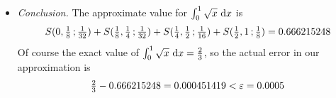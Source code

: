 {\begin{itemize}
\item\emph{Conclusion.} The approximate value for $\int_0^1\sqrt{x}\ \mathrm{d}x$
is
\begin{equation*}
S(0,\tfrac{1}{8}\,;\tfrac{1}{32})
+S(\tfrac{1}{8},\tfrac{1}{4}\,;\tfrac{1}{32})
+S(\tfrac{1}{4},\tfrac{1}{2}\,;\tfrac{1}{16})
+S(\tfrac{1}{2},1\,;\tfrac{1}{8})
=0.666215248
\end{equation*}
Of course the exact value of $\int_0^1\sqrt{x}\ \mathrm{d}x=\tfrac{2}{3}$,
so the actual error in our approximation is
\begin{equation*}
\tfrac{2}{3}-0.666215248 = 0.000451419 <\varepsilon = 0.0005
\end{equation*}


\end{itemize}
}%






